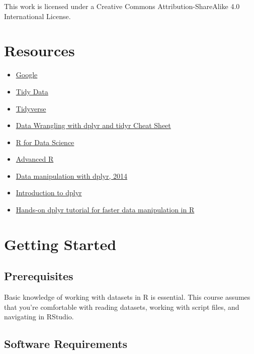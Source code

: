 \documentclass[]{article}
\theoremstyle{definition}
\theoremstyle{definition}
\theoremstyle{definition}
\theoremstyle{remark}
\begin{document}
This work is licensed under a Creative Commons Attribution-ShareAlike
4.0 International License.

\section{Resources}\label{resources}

\begin{itemize}
\item
  \href{http://www.google.com}{Google}
\item
  \href{http://vita.had.co.nz/papers/tidy-data.pdf}{Tidy Data}
\item
  \href{http://tidyverse.org}{Tidyverse}
\item
  \href{https://www.rstudio.com/wp-content/uploads/2015/02/data-wrangling-cheatsheet.pdf}{Data
  Wrangling with dplyr and tidyr Cheat Sheet}
\item
  \href{http://r4ds.had.co.nz}{R for Data Science}
\item
  \href{http://adv-r.had.co.nz}{Advanced R}
\item
  \href{http://bit.ly/hadley_dplyr_tutorial_2014}{Data manipulation with
  dplyr, 2014}
\item
  \href{https://cran.rstudio.com/web/packages/dplyr/vignettes/introduction.html}{Introduction
  to dplyr}
\item
  \href{https://www.r-bloggers.com/hands-on-dplyr-tutorial-for-faster-data-manipulation-in-r}{Hands-on
  dplyr tutorial for faster data manipulation in R}
\end{itemize}

\section{Getting Started}\label{getting-started}

\subsection{Prerequisites}\label{prerequisites}

Basic knowledge of working with datasets in R is essential. This course
assumes that you're comfortable with reading datasets, working with
script files, and navigating in RStudio.

\subsection{Software Requirements}\label{software-requirements}
\end{document}
